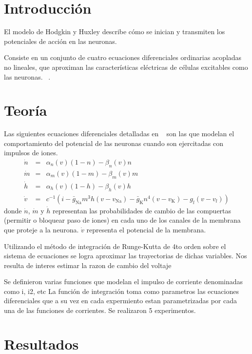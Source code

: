 \documentclass[aps,prl,twocolumn,groupedaddress]{revtex4-2}
\begin{document}
\section{Introducción}

El modelo de Hodgkin y Huxley describe cómo se inician y transmiten los potenciales de acción en las neuronas.

Consiste en un conjunto de cuatro ecuaciones diferenciales ordinarias acopladas no lineales, que aproximan las características eléctricas de células excitables como las neuronas.
~\cite{HodgkinyHuxleyWikipedia}.

\section{Teoría}

Las siguientes ecuaciones diferenciales
detalladas en ~\cite{HodgkinyHuxleyWikipedia} 
son las que modelan el comportamiento del potencial de las neuronas cuando son ejercitadas con impulsos de iones.
\begin{eqnarray*}
\dot{n}&=&\alpha_n(v)(1-n)-\beta_n(v) n\\
\dot{m}&=&\alpha_m(v)(1-m)-\beta_m(v) m\\
\dot{h}&=&\alpha_h(v)(1-h)-\beta_h(v) h\\
\dot{v}&=&c^{-1}(i-\bar{g}_{\mathrm{Na}}m^3h(v-v_{\mathrm{Na}})-\bar{g}_{\mathrm{K}}n^4(v-v_{\mathrm{K}})-g_{l}(v-v_{l}))
\end{eqnarray*}
donde $\dot{n}$, $\dot{m}$ y $\dot{h}$
representan las probabilidades de cambio de las compuertas (permitir o bloquear paso de iones) en cada uno de los canales de la membrana que proteje a la neurona. $\dot{v}$ representa el potencial de la membrana.

Utilizando el método de integración de Runge-Kutta de 4to orden  sobre el sistema de ecuaciones se logra aproximar las trayectorias de dichas variables.
Nos resulta de interes estimar la razon de cambio del voltaje


Se definieron varias funciones que modelan el impulso de corriente
denominadas como i, i2, etc
La función de integración toma como parametros las ecuaciones diferenciales que a su vez en cada expermiento estan parametrizadas por cada una de las funciones de corrientes.
Se realizaron 5 experimentos.
 

\section{Resultados}
\end{document}
